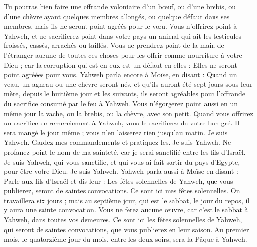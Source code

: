 \begin{multicols}{2}
Tu pourras bien faire une offrande volontaire d'un bœuf, ou d'une brebis, ou d'une chèvre ayant quelques membres allongés, ou quelque défaut dans ses membres, mais ils ne seront point agréés pour le vœu.
Vous n'offrirez point à Yahweh, et ne sacrifierez point dans votre pays un animal qui ait les testicules froissés, cassés, arrachés ou taillés.
Vous ne prendrez point de la main de l'étranger aucune de toutes ces choses pour les offrir comme nourriture à votre Dieu ; car la corruption qui est en eux est un défaut en elles : Elles ne seront point agréées pour vous.
Yahweh parla encore à Moïse, en disant :
Quand un veau, un agneau ou une chèvre seront nés, et qu'ils auront été sept jours sous leur mère, depuis le huitième jour et les suivants, ils seront agréables pour l'offrande du sacrifice consumé par le feu à Yahweh.
Vous n'égorgerez point aussi en un même jour la vache, ou la brebis, ou la chèvre, avec son petit.
Quand vous offrirez un sacrifice de remerciement à Yahweh, vous le sacrifierez de votre bon gré.
Il sera mangé le jour même ; vous n'en laisserez rien jusqu'au matin. Je suis Yahweh.
Gardez mes commandements et pratiquez-les. Je suis Yahweh.
Ne profanez point le nom de ma sainteté, car je serai sanctifié entre les fils d'Israël. Je suis Yahweh, qui vous sanctifie,
et qui vous ai fait sortir du pays d'Egypte, pour être votre Dieu. Je suis Yahweh.
\VerseOne{}Yahweh parla aussi à Moïse en disant :
Parle aux fils d'Israël et dis-leur : Les fêtes solennelles de Yahweh, que vous publierez, seront de saintes convocations. Ce sont ici mes fêtes solennelles.
On travaillera six jours ; mais au septième jour, qui est le sabbat, le jour du repos, il y aura une sainte convocation. Vous ne ferez aucune œuvre, car c'est le sabbat à Yahweh, dans toutes vos demeures.
Ce sont ici les fêtes solennelles de Yahweh, qui seront de saintes convocations, que vous publierez en leur saison.
Au premier mois, le quatorzième jour du mois, entre les deux soirs, sera la Pâque à Yahweh.

\end{multicols}
